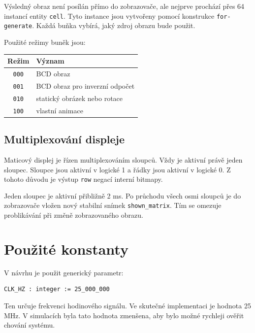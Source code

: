 \documentclass[11pt,a4paper]{article}
\begin{document}
Výsledný obraz není posílán přímo do zobrazovače, ale nejprve prochází přes 64 instancí entity \texttt{cell}. Tyto instance jsou vytvořeny pomocí konstrukce \texttt{for-generate}. Každá buňka vybírá, jaký zdroj obrazu bude použit.

\newpage

\noindent Použité režimy buněk jsou:

\begin{center}
\begin{tabular}{|c|l|}
\hline
Režim & Význam \\
\hline
\texttt{000} & BCD obraz \\
\texttt{001} & BCD obraz pro inverzní odpočet \\
\texttt{010} & statický obrázek nebo rotace \\
\texttt{100} & vlastní animace \\
\hline
\end{tabular}
\end{center}

\subsection{Multiplexování displeje}

Maticový displej je řízen multiplexováním sloupců. Vždy je aktivní právě jeden sloupec. Sloupce jsou aktivní v logické 1 a řádky jsou aktivní v logické 0. Z tohoto důvodu je výstup \texttt{row} negací interní bitmapy.

Jeden sloupec je aktivní přibližně 2 ms. Po průchodu všech osmi sloupců je do zobrazovače vložen nový stabilní snímek \texttt{shown\_matrix}. Tím se omezuje problikávání při změně zobrazovaného obrazu.

\section{Použité konstanty}

V návrhu je použit generický parametr:

\begin{lstlisting}
CLK_HZ : integer := 25_000_000
\end{lstlisting}

Ten určuje frekvenci hodinového signálu. Ve skutečné implementaci je hodnota 25 MHz. V simulacích byla tato hodnota zmenšena, aby bylo možné rychleji ověřit chování systému.
\end{document}
